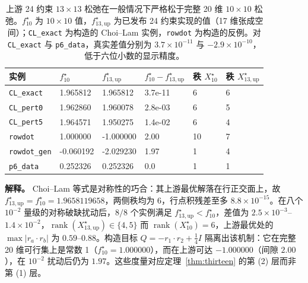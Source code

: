 \begin{table}[t]
\centering
\caption{上游 24 约束 $13\times13$ 松弛在一般情况下严格松于完整 20 维 $10\times10$ 松弛。$f^\star_{10}$ 为 $10\times10$ 值，$f^\star_{13,\mathrm{up}}$ 为已发布 24 约束实现的值（17 维张成空间）；\texttt{CL\_exact} 为构造的 Choi--Lam 实例，\texttt{rowdot} 为构造的反例。对 \texttt{CL\_exact} 与 \texttt{p6\_data}，真实差值分别为 $3.7\times10^{-11}$ 与 $-2.9\times10^{-10}$，低于六位小数的显示精度。}
\label{tab:13v10}
\footnotesize
\setlength{\tabcolsep}{6pt}
\begin{tabular}{@{}l l l l l l@{}}
\toprule
实例 & $f^\star_{10}$ & $f^\star_{13,\mathrm{up}}$ & $f^\star_{10}-f^\star_{13,\mathrm{up}}$ & 秩 $X_{10}^\star$ & 秩 $X_{13,\mathrm{up}}^\star$\\
\midrule
\texttt{CL\_exact} & 1.965812 & 1.965812 & 3.7e-11 & 6 & 6\\
\texttt{CL\_pert0} & 1.962860 & 1.960078 & 2.8e-03 & 6 & 5\\
\texttt{CL\_pert5} & 1.964571 & 1.950275 & 1.4e-02 & 6 & 4\\
\texttt{rowdot} & 1.000000 & -1.000000 & 2.00 & 10 & 7\\
\texttt{rowdot\_gen} & -0.060192 & -2.029230 & 1.97 & 1 & 4\\
\texttt{p6\_data} & 0.252326 & 0.252326 & 0.0 & 1 & 1\\
\bottomrule
\end{tabular}
\end{table}

\textbf{解释。} Choi--Lam 等式是对称性的巧合：其上游最优解落在行正交面上，故 $f^\star_{13,\mathrm{up}}=f^\star_{10}=1.9658119658$，两侧秩均为 6，行点积残差至多 $8.8\times10^{-15}$。在八个 $10^{-2}$ 量级的对称破缺扰动后，$8/8$ 个实例满足 $f^\star_{13,\mathrm{up}}<f^\star_{10}$，差值为 $2.5\times10^{-3}$--$1.4\times10^{-2}$，$\operatorname{rank}(X^\star_{13,\mathrm{up}})\in\{4,5\}$ 而 $\operatorname{rank}(X^\star_{10})=6$，上游最优处的 $\max|r_a\cdot r_b|$ 为 $0.59$--$0.88$。构造目标 $Q=-r_1\cdot r_2+\tfrac14I$ 隔离出该机制：它在完整 20 维可行集上是常数 1（$f^\star_{10}=1.000000$），而在上游可达 $-1.000000$（间隙 $2.00$），在 $10^{-2}$ 扰动后仍为 $1.97$。这些度量对应定理~\ref{thm:thirteen} 的第 (2) 层而非第 (1) 层。

